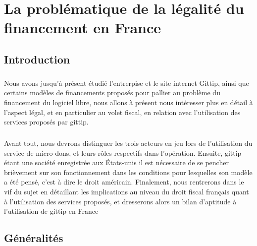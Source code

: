 \chapter{La problématique de la légalité du financement en France}\label{chapter3}
    \section{Introduction}
        \paragraph{}
            Nous avons jusqu'à présent étudié l'entrerpise et le site
            internet Gittip, ainsi que certains modèles de financements
            proposés pour pallier au problème du financement du logiciel
            libre, nous allons à présent nous intéresser plus en détail
            à l'aspect légal, et en particulier au volet fiscal, en relation
            avec l'utilisation des services proposés par gittip.
        \paragraph{}
            Avant tout, nous devrons distinguer les trois acteurs en jeu
            lors de l'utilisation du service de micro dons, et leurs rôles
            respectifs dans l'opération.
            Ensuite, gittip étant une société enregistrée aux États-unis
            il est nécessaire de se pencher brièvement sur son fonctionnement
            dans les conditions pour lesquelles son modèle a été pensé,
            c'est à dire le droit américain.
            Finalement, nous rentrerons dans le vif du sujet en détaillant les
            implications au niveau du droit fiscal français quant à
            l'utilisation des services proposés, et dresserons alors un bilan
            d'aptitude à l'utilisation de gittip en France

    \section{Généralités}
